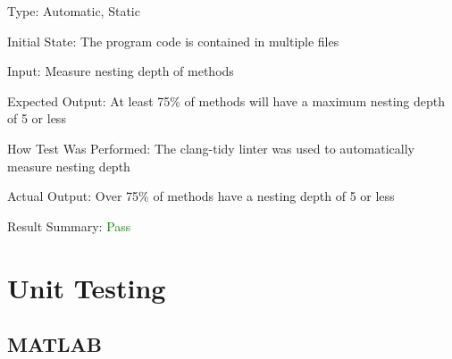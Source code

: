 \documentclass[12pt, titlepage]{article}
\begin{document}
\begin{enumerate}
Type: Automatic, Static

Initial State: The program code is contained in multiple files

Input: Measure nesting depth of methods

Expected Output: At least 75\% of methods will have a maximum nesting depth of 5 or less

How Test Was Performed: The clang-tidy linter was used to automatically measure nesting depth

Actual Output: Over 75\% of methods have a nesting depth of 5 or less

Result Summary: \textcolor{green} {Pass}

\end{enumerate}

\section{Unit Testing}

\subsection{MATLAB}
\end{document}
